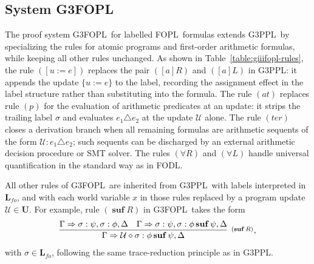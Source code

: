 \documentclass[manuscript,screen]{acmart}
\newcommand{\bff}[1]{\mathbf{#1}}
\newcommand{\mcl}[1]{\mathcal{#1}}
\newcommand{\Conf}[0]{\bff{L}}
\newcommand{\cat}[0]{\diamond}
\newcommand{\GiiiPPL}[0]{\mbox{G3PPL}}
\newcommand{\GiiiFOPL}[0]{\mbox{G3FOPL}}
\newcommand{\GiiiFOPLcyc}[0]{\mbox{G3FOPL}}
\DeclareMathOperator{\osuf}{\mathbf{suf}}
\newcommand{\fo}[0]{{\textit{fo}}}
\newcommand{\Upd}[0]{\textbf{U}}
\newcommand{\upd}[0]{\mcl{U}}
\newcommand{\FOPL}[0]{\mbox{FOPL}}
\newcommand{\FODL}[0]{\mbox{FODL}}
\begin{document}
\subsection{System \GiiiFOPLcyc}
\label{section:System GiiiFOPLcyc}

The proof system \GiiiFOPL\ for labelled \FOPL\ formulas extends \GiiiPPL\ by specializing the rules for atomic programs and first-order arithmetic formulas, while keeping all other rules unchanged.  As shown in Table~\ref{table:giiifopl-rules}, the rule $([u:=e])$ replaces the pair $([a]R)$ and $([a]L)$ in \GiiiPPL: it appends the update $\{u:=e\}$ to the label, recording the assignment effect in the label structure rather than substituting into the formula.  The rule $(\textit{at})$ replaces rule $(p)$ for the evaluation of arithmetic predicates at an update: it strips the trailing label $\sigma$ and evaluates $e_1\triangle e_2$ at the update $\upd$ alone.  The rule $(\textit{ter})$ closes a derivation branch when all remaining formulas are arithmetic sequents of the form $\upd : e_1\triangle e_2$; such sequents can be discharged by an external arithmetic decision procedure or SMT solver.  
The rules $(\forall R)$ and $(\forall L)$ handle universal quantification in the standard way as in \FODL.  

All other rules of \GiiiFOPL\ are inherited from \GiiiPPL\ with labels interpreted in $\Conf_\fo$, and with each world variable $x$ in those rules replaced by a program update $\upd\in \Upd$.  For example, rule $(\osuf R)$ in \GiiiFOPL\ takes the form
$$
  \begin{aligned}
 \infer[^{(\osuf R)}]
 {\Gamma\Rightarrow \upd\cat \sigma : \phi\osuf\psi, \Delta}
 {\Gamma\Rightarrow \sigma : \psi, \sigma : \phi, \Delta & \Gamma\Rightarrow  \sigma : \psi, \sigma : \phi\osuf \psi, \Delta}
 \end{aligned},
$$
with $\sigma\in \Conf_\fo$, following the same trace-reduction principle as in \GiiiPPL.
\end{document}
